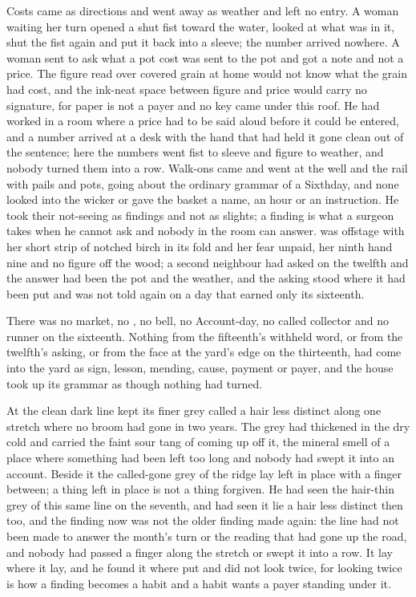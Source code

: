 Costs came as directions and went away as weather and left no entry. A woman waiting her turn opened a shut fist toward the water, looked at what was in it, shut the fist again and put it back into a sleeve; the number arrived nowhere. A woman sent to ask what a pot cost was sent to the pot and got a note and not a price. The figure read over covered grain at home would not know what the grain had cost, and the ink-neat space between figure and price would carry no signature, for paper is not a payer and no key came under this roof. He had worked in a room where a price had to be said aloud before it could be entered, and a number arrived at a desk with the hand that had held it gone clean out of the sentence; here the numbers went fist to sleeve and figure to weather, and nobody turned them into a row. Walk-ons came and went at the well and the rail with pails and pots, going about the ordinary grammar of a Sixthday, and none looked into the wicker or gave the basket a name, an hour or an instruction. He took their not-seeing as findings and not as slights; a finding is what a surgeon takes when he cannot ask and nobody in the room can answer.  was offstage with her short strip of notched birch in its fold and her fear unpaid, her ninth hand nine and no figure off the wood; a second neighbour had asked on the twelfth and the answer had been the pot and the weather, and the asking stood where it had been put and was not told again on a day that earned only its sixteenth.

There was no market, no , no bell, no Account-day, no called collector and no runner on the sixteenth. Nothing from the fifteenth's withheld word, or from the twelfth's asking, or from the face at the yard's edge on the thirteenth, had come into the yard as sign, lesson, mending, cause, payment or payer, and the house took up its grammar as though nothing had turned.

\scenebreak

At  the clean dark line kept its finer grey called  a hair less distinct along one stretch where no broom had gone in two years. The grey had thickened in the dry cold and carried the faint sour tang of  coming up off it, the mineral smell of a place where something had been left too long and nobody had swept it into an account. Beside it the called-gone grey of the ridge lay left in place with a finger between; a thing left in place is not a thing forgiven. He had seen the hair-thin grey of this same line on the seventh, and had seen it lie a hair less distinct then too, and the finding now was not the older finding made again: the line had not been made to answer the month's turn or the reading that had gone up the road, and nobody had passed a finger along the stretch or swept it into a row. It lay where it lay, and he found it where put and did not look twice, for looking twice is how a finding becomes a habit and a habit wants a payer standing under it.

